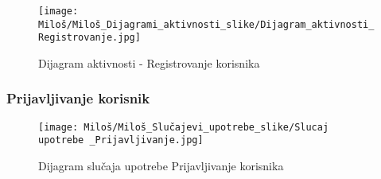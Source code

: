 \documentclass[a4paper]{article}
\begin{document}
\begin{figure}[htp]
    \centering
    \texttt{[image: Miloš/Miloš\_Dijagrami\_aktivnosti\_slike/Dijagram\_aktivnosti\_Registrovanje.jpg]}
    \caption{Dijagram aktivnosti - Registrovanje korisnika}
    \label{fig:Registracija aktivnost}
\end{figure}


\subsubsection{Prijavljivanje korisnik}

\begin{figure}[htp]
    \centering
    \texttt{[image: Miloš/Miloš\_Slučajevi\_upotrebe\_slike/Slucaj upotrebe \_Prijavljivanje.jpg]}
    \caption{Dijagram slučaja upotrebe Prijavljivanje korisnika}
    \label{fig:Prijavljivanje}
\end{figure}
\end{document}
